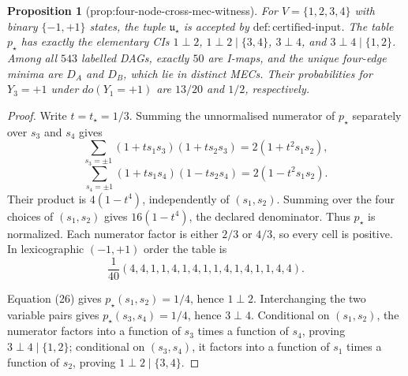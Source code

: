\documentclass{article}
\newtheorem{proposition}{Proposition}
\begin{document}
\begin{proposition}[prop:four-node-cross-mec-witness]\label{prop:four-node-cross-mec-witness}
For \(V=\{1,2,3,4\}\) with binary \(\{-1,+1\}\) states, the tuple \(\mathfrak u_{\star}\) is accepted by \(\mathrm{def{:}certified\text{-}input}\). The table \(p_{\star}\) has exactly the elementary CIs \(1\perp2\), \(1\perp2\mid\{3,4\}\), \(3\perp4\), and \(3\perp4\mid\{1,2\}\). Among all \(543\) labelled DAGs, exactly \(50\) are I-maps, and the unique four-edge minima are \(D_A\) and \(D_B\), which lie in distinct MECs. Their probabilities for \(Y_3=+1\) under \(do(Y_1=+1)\) are \(13/20\) and \(1/2\), respectively.
\end{proposition}
\begin{proof}
Write \(t=t_\star=1/3\).  Summing the unnormalised numerator of \(p_\star\) separately over \(s_3\) and \(s_4\) gives
\[
 \sum_{s_3=\pm1}(1+ts_1s_3)(1+ts_2s_3)
 =2(1+t^2s_1s_2),
\]
\[
 \sum_{s_4=\pm1}(1+ts_1s_4)(1-ts_2s_4)
 =2(1-t^2s_1s_2). \tag{26}
\]
Their product is \(4(1-t^4)\), independently of \((s_1,s_2)\).  Summing over the four choices of \((s_1,s_2)\) gives \(16(1-t^4)\), the declared denominator.  Thus \(p_\star\) is normalized.  Each numerator factor is either \(2/3\) or \(4/3\), so every cell is positive.  In lexicographic \((-1,+1)\) order the table is
\[
 \frac1{40}(4,4,1,1,4,1,4,1,1,4,1,4,1,1,4,4). \tag{27}
\]

Equation (26) gives \(p_\star(s_1,s_2)=1/4\), hence \(1\perp2\).  Interchanging the two variable pairs gives \(p_\star(s_3,s_4)=1/4\), hence \(3\perp4\).  Conditional on \((s_1,s_2)\), the numerator factors into a function of \(s_3\) times a function of \(s_4\), proving \(3\perp4\mid\{1,2\}\); conditional on \((s_3,s_4)\), it factors into a function of \(s_1\) times a function of \(s_2\), proving \(1\perp2\mid\{3,4\}\).


\end{proof}
\end{document}
